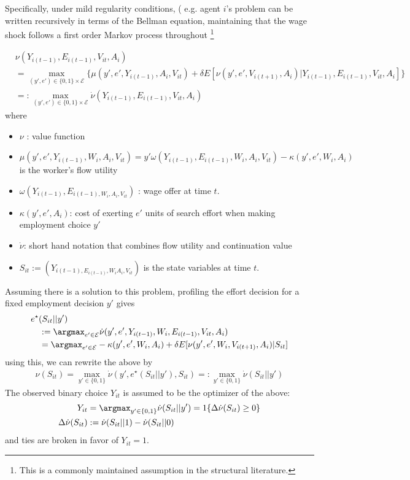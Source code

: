 \documentclass[uplatex,dvipdfmx]{jsarticle}
\begin{document}
Specifically, under mild regularity conditions, ( e.g. \cite{stokey1989recursive,rust_chapter_1994}agent $i$'s problem can be written recursively in terms of the Bellman equation, maintaining that the wage shock follows a first order Markov process throughout \footnote{This is a commonly maintained assumption in the structural literature.}

\begin{align}
    \label{eq: bellman1}
    &\nu(Y_{i(t-1)}, E_{i(t-1)}, V_{it}, A_i) \\
    &= \max_{(y', e') \in \{0,1\} \times \mathcal{E}} \{ \mu(y', e', Y_{i(t-1)},A_i, V_{it} )  + \delta E[ \nu(y', e', V_{i(t+1)}, A_i) | Y_{i(t-1)}, E_{i(t-1)},V_{it}, A_i ] \}\\ 
    &=: \max_{ (y', e') \in \{0,1\} \times \mathcal{E} }\dot{\nu}( Y_{i(t-1)}, E_{i(t-1)}, V_{it}, A_i)
\end{align}
where
\begin{itemize}
    \item $\nu$ : value function 
    \item $\mu(y', e', Y_{i(t-1)},W_i,A_i, V_{it} ) = y' \omega (Y_{i(t-1)}, E_{i(t-1)}, W_i,A_i, V_{it}) - \kappa( y', e', W_i,A_i)$ is the worker's flow utility
    \item $\omega (Y_{i(t-1)}, E_{i(t-1), W_i,A_i, V_{it}})$ : wage offer at time $t$.
    \item $\kappa( y', e', A_i)$: cost of exerting $e'$ units of search effort when making employment choice $y'$
    \item $\dot{\nu} $: short hand notation that combines flow utility and continuation value 
    \item $S_{it}:= (Y_{i(t-1), E_{i(t-1)},W_i A_i, V_{it}})$ is the state variables at time $t$.
\end{itemize}


Assuming there is a solution to this problem, profiling the effort decision for a fixed employment decision $y'$ gives
\begin{align}
    \label{eq:estar1}
     &e^ \star  (S_{it} || y' ) \\
     &\quad: = \argmax _ { e' \in \mathcal{ E} } \dot{ \nu} ( y', e' , Y_{i (t-1) } , W_i , E_ { i(t-1) } , V_{it}, A_ i )\\
    &\quad= \argmax _ { e' \in \mathcal{ E} } - \kappa ( y' , e', W_i, A_i ) + \delta E[ \nu ( y' , e' ,W_i, V_{ i (t+1) } , A_i ) | S_{it} ]
\end{align}
using this, we can rewrite the above by
\begin{align*}
    \nu(S_{it} ) = \max_{ y' \in \{ 0,1 \} } \dot{\nu} ( y' , e^\star ( S_{it} || y' ) , S_{it} ) =: \max _{ y' \in \{ 0,1 \} } \dot{ \nu} ( S_{it} || y' )
\end{align*}
The observed binary choice $ Y_{it}$ is assumed to be the optimizer of the above: 
\begin{align*}
    Y_{it} &= \argmax_{ y' \in \{0,1 \}} \dot{ \nu } ( S_{it} || y' ) = 1\{ \Delta \dot{ \nu} ( S_{it}) \geq 0 \}  \\
\Delta \dot{\nu} ( S_{it} ) &: = \dot{ \nu} ( S_{it} || 1) - \dot{\nu} (S_{it} || 0 )
\end{align*}
and ties are broken in favor of $Y_{it} =1$.
\end{document}
